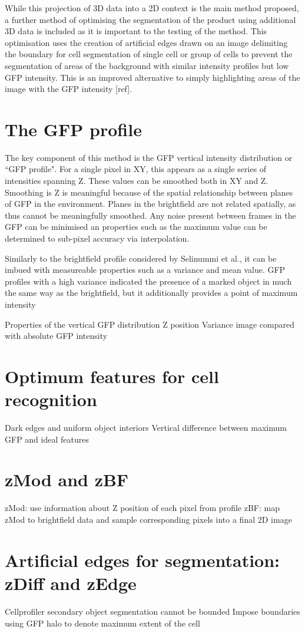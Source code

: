 While this projection of 3D data into a 2D context is the main method proposed, a further method of optimising the segmentation of the product using additional 3D data is included as it is important to the testing of the method. This optimisation uses the creation of artificial edges drawn on an image delimiting the boundary for cell segmentation of single cell or group of cells to prevent the segmentation of areas of the background with similar intensity profiles but low GFP intensity. This is an improved alternative to simply highlighting areas of the image with the GFP intensity [ref].

\section{The GFP profile}

The key component of this method is the GFP vertical intensity distribution or ``GFP profile". For a single pixel in XY, this appears as a single series of intensities spanning Z. These values can be smoothed both in XY and Z. Smoothing is Z is meaningful because of the spatial relationship between planes of GFP in the environment. Planes in the brightfield are not related spatially, as thus cannot be meaningfully smoothed. Any noise present between frames in the GFP can be minimised an properties such as the maximum value can be determined to sub-pixel accuracy via interpolation. 

Similarly to the brightfield profile considered by Selinummi et al., it can be imbued with measureable properties such as a variance and mean value. GFP profiles with a high variance indicated the presence of a marked object in much the same way as the brightfield, but it additionally provides a point of maximum intensity

Properties of the vertical GFP distribution
Z position
Variance image compared with absolute GFP intensity

\section{Optimum features for cell recognition}

Dark edges and uniform object interiors
Vertical difference between maximum GFP and ideal features

\section{zMod and zBF}

zMod: use information about Z position of each pixel from profile
zBF: map zMod to brightfield data and sample corresponding pixels into a final 2D image

\section{Artificial edges for segmentation: zDiff and zEdge}

Cellprofiler secondary object segmentation cannot be bounded
Impose boundaries using GFP halo to denote maximum extent of the cell
